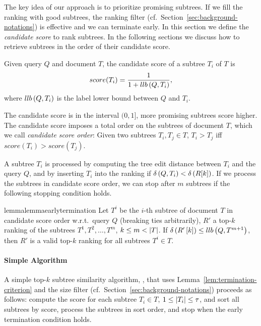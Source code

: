 
The key idea of our approach is to prioritize promising subtrees. If we fill
the ranking with good subtrees, the ranking filter
(cf.~Section~\ref{sec:background-notations}) is effective and we can terminate
early. In this section we define the \emph{candidate score} to rank subtrees. In the following sections we discuss how to retrieve subtrees in the order of their candidate score.

\begin{definition}
\label{def:candidate-score}
%
Given query $Q$ and document $T$, the candidate score of a subtree $T_i$ of $T$ is
\[
  score(T_i)=\frac{1}{1+llb \left( Q, T_i \right)},
\]
where $llb \left( Q, T_i \right)$ is the label lower bound between $Q$ and $T_i$.
\end{definition}

The candidate score is in the interval $(0,1]$, more promising subtrees score higher. The candidate score imposes a total order on the subtrees of document $T$, which we call \emph{candidate score order}: Given two subtrees $T_i, T_j \in T$, $T_i > T_j$ iff $score\left( T_i \right) > score \left( T_j \right)$.

A subtree $T_i$ is processed by computing the tree edit distance between $T_i$ and the query $Q$, and by inserting $T_i$ into the ranking if $\delta \left( Q, T_i \right)<\delta \left( R[k] \right)$.
%
If we process the subtrees in candidate score order, we can stop after $m$ subtrees if the following stopping condition holds.

\begin{restatable}{lemma}{lemmaearlytermination}
\label{lem:termination-criterion}
%
Let $T^i$ be the $i$-th subtree of document $T$ in candidate score order w.r.t.\ query $Q$ (breaking ties arbitrarily), $R'$ a top-$k$ ranking of the subtrees $T^1, T^2, \ldots, T^m$, $k \leq m < \left| T \right|$. If $\delta \left( R'\left[ k \right] \right) \leq llb \left( Q, T^{m + 1} \right)$, then $R'$ is a valid top-$k$ ranking for all subtrees $T^i \in T$.
\end{restatable}

\paragraph{Simple Algorithm}

A simple top-$k$ subtree similarity algorithm, \simplealg{}, that uses  Lemma~\ref{lem:termination-criterion} and the size filter (cf.\ Section~\ref{sec:background-notations}) proceeds as follows:
compute the score for each subtree $T_i \in T$, $1 \leq \left| T_i \right| \leq \tau$, and sort all subtrees by score, process the subtrees in sort order, and stop when the early termination condition holds.

